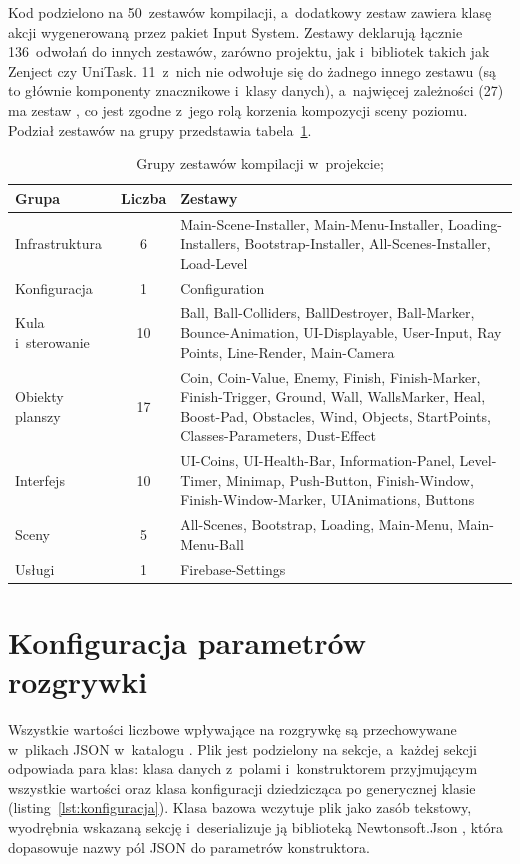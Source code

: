 Kod podzielono na 50~zestawów kompilacji, a~dodatkowy zestaw  zawiera klasę
akcji wygenerowaną przez pakiet Input System. Zestawy deklarują łącznie 136~odwołań do
innych zestawów, zarówno projektu, jak i~bibliotek takich jak Zenject czy UniTask. 11~z~nich
nie odwołuje się do żadnego innego zestawu (są to głównie komponenty znacznikowe i~klasy
danych), a~najwięcej zależności (27) ma zestaw , co jest zgodne
z~jego rolą korzenia kompozycji sceny poziomu. Podział zestawów na grupy przedstawia tabela~\ref{tab:asmdef}.

\begin{table}[!htb]
  \centering
  \caption{Grupy zestawów kompilacji w~projekcie; \zrodloWlasne}
  \label{tab:asmdef}
  \begin{tabularx}{\textwidth}{>{\raggedright\arraybackslash}p{3.2cm} c X}
    \toprule
    \textbf{Grupa} & \textbf{Liczba} & \textbf{Zestawy} \\
    \midrule
    Infrastruktura & 6 & Main-Scene-Installer, Main-Menu-Installer, Loading-Installers, Bootstrap-Installer, All-Scenes-Installer, Load-Level \\
    Konfiguracja & 1 & Configuration \\
    Kula i~sterowanie & 10 & Ball, Ball-Colliders, BallDestroyer, Ball-Marker, Bounce-Animation, UI-Displayable, User-Input, Ray Points, Line-Render, Main-Camera \\
    Obiekty planszy & 17 & Coin, Coin-Value, Enemy, Finish, Finish-Marker, Finish-Trigger, Ground, Wall, WallsMarker, Heal, Boost-Pad, Obstacles, Wind, Objects, StartPoints, Classes-Parameters, Dust-Effect \\
    Interfejs & 10 & UI-Coins, UI-Health-Bar, Information-Panel, Level-Timer, Minimap, Push-Button, Finish-Window, Finish-Window-Marker, UIAnimations, Buttons \\
    Sceny & 5 & All-Scenes, Bootstrap, Loading, Main-Menu, Main-Menu-Ball \\
    Usługi & 1 & Firebase-Settings \\
    \bottomrule
  \end{tabularx}
\end{table}

\section{Konfiguracja parametrów rozgrywki}

Wszystkie wartości liczbowe wpływające na rozgrywkę są przechowywane w~plikach JSON
w~katalogu . Plik jest podzielony na sekcje, a~każdej
sekcji odpowiada para klas: klasa danych z~polami  i~konstruktorem
przyjmującym wszystkie wartości oraz klasa konfiguracji dziedzicząca po generycznej klasie
 (listing~\ref{lst:konfiguracja}). Klasa bazowa wczytuje
plik jako zasób tekstowy, wyodrębnia wskazaną sekcję i~deserializuje ją biblioteką
Newtonsoft.Json \cite{newtonsoft}, która dopasowuje nazwy pól JSON do parametrów
konstruktora.

